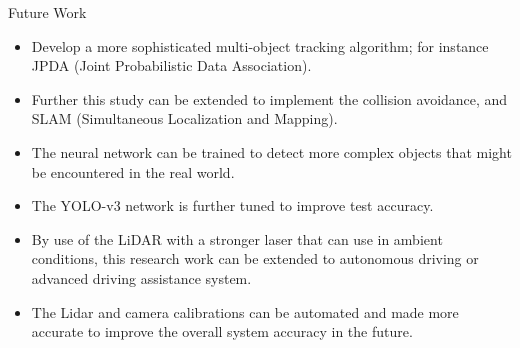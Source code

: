 \documentclass[10pt]{beamer}
\begin{document}
\begin{frame}{Future Work}
\begin{itemize}
    \item Develop a more sophisticated multi-object tracking algorithm; for instance JPDA (Joint Probabilistic Data Association). 
    \item Further this study can be extended to implement the collision avoidance, and SLAM (Simultaneous Localization and Mapping).
    \item The neural network can be trained to detect more complex objects that might be encountered in the real world.
    \item The YOLO-v3 network is further tuned to improve test accuracy.
    \item By use of the LiDAR with a stronger laser that can use in ambient conditions, this research work can be extended to autonomous driving or advanced driving assistance system.
    \item The Lidar and camera calibrations can be automated and made more accurate to improve the overall system accuracy in the future. 
\end{itemize}    
\end{frame}
\end{document}
